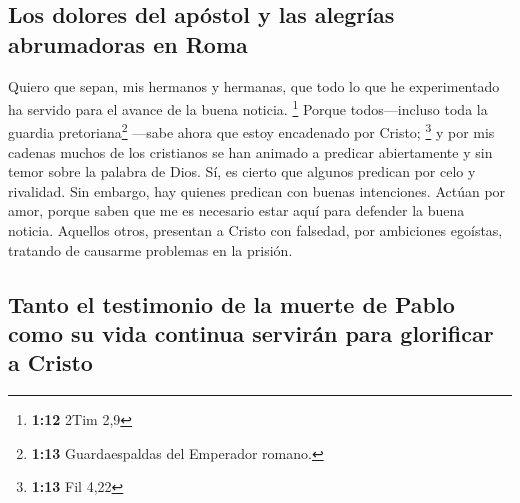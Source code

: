 \hypertarget{los-dolores-del-apuxf3stol-y-las-alegruxedas-abrumadoras-en-roma}{%
\subsection{Los dolores del apóstol y las alegrías abrumadoras en
Roma}\label{los-dolores-del-apuxf3stol-y-las-alegruxedas-abrumadoras-en-roma}}

 Quiero que sepan, mis hermanos y hermanas, que todo lo
que he experimentado ha servido para el avance de la buena noticia.
\footnote{\textbf{1:12} 2Tim 2,9}  Porque todos---incluso
toda la guardia pretoriana\footnote{\textbf{1:13} Guardaespaldas del
  Emperador romano.} ---sabe ahora que estoy encadenado por Cristo;
\footnote{\textbf{1:13} Fil 4,22}  y por mis cadenas
muchos de los cristianos se han animado a predicar abiertamente y sin
temor sobre la palabra de Dios.  Sí, es cierto que
algunos predican por celo y rivalidad. Sin embargo, hay quienes predican
con buenas intenciones.  Actúan por amor, porque saben
que me es necesario estar aquí para defender la buena noticia.
 Aquellos otros, presentan a Cristo con falsedad, por
ambiciones egoístas, tratando de causarme problemas en la prisión.

\hypertarget{tanto-el-testimonio-de-la-muerte-de-pablo-como-su-vida-continua-serviruxe1n-para-glorificar-a-cristo}{%
\subsection{Tanto el testimonio de la muerte de Pablo como su vida
continua servirán para glorificar a
Cristo}\label{tanto-el-testimonio-de-la-muerte-de-pablo-como-su-vida-continua-serviruxe1n-para-glorificar-a-cristo}}

